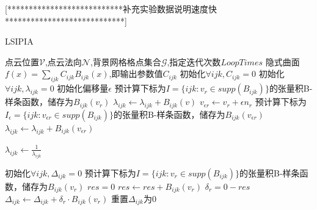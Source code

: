 [***************************补充实验数据说明速度快****************************]
\begin{algorithm}
    \caption{LSIPIA}
    \label{alg:LSIPIA}
    \begin{algorithmic}[1]
    \Require 点云位置$\mathcal{V}$,点云法向$\mathcal{N}$,背景网格格点集合$\mathcal{G}$,指定迭代次数$LoopTimes$
    \Ensure 隐式曲面$f(x) = \sum_{ijk} C_{ijk}B_{ijk}(x)$,即输出参数值$C_{ijk}$
    \State 初始化$\forall ijk,C_{ijk} = 0$
    \State 初始化$\forall ijk,\lambda_{ijk} = 0$
    \State 初始化偏移量$\epsilon$
        \State 预计算下标为$I = \{ijk : v_r \in supp(B_{ijk})\}$的张量积B-样条函数，储存为$B_{ijk}(v_r)$
            \State $\lambda_{ijk} \leftarrow \lambda_{ijk} + B_{ijk}(v)$
        \EndFor
        \State $v_{\epsilon r} \leftarrow v_r + \epsilon n_r$
        \State 预计算下标为$I_{\epsilon} = \{ijk : v_{\epsilon r} \in supp(B_{ijk})\}$的张量积B-样条函数，储存为$B_{ijk}(v_{\epsilon r})$
            \State $\lambda_{ijk} \leftarrow \lambda_{ijk} + B_{ijk}(v_{\epsilon r})$
        \EndFor
    \EndFor
    
            \State $\lambda_{ijk}\leftarrow \frac{1}{\lambda_{ijk}}$
        \EndIf
    \EndFor

    \State 初始化$\forall ijk,\Delta_{ijk} = 0$
            \State 预计算下标为$I = \{ijk : v_r \in supp(B_{ijk})\}$的张量积B-样条函数，储存为$B_{ijk}(v_r)$
            \State $res = 0$
                \State $res \leftarrow res + B_{ijk}(v_r)$ 
            \EndFor
            \State $\delta_r = 0 - res$
                \State $\Delta_{ijk}\leftarrow \Delta_{ijk} + \delta_r \cdot B_{ijk}(v_r)$ 
                \State 重置$\Delta_{ijk}$为0
            \EndFor
        \EndFor
    \EndFor

    \end{algorithmic}
\end{algorithm}

